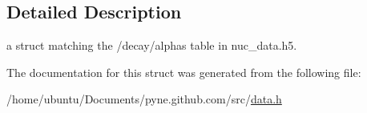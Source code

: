 \subsection{Detailed Description}
a struct matching the \textquotesingle{}/decay/alphas\textquotesingle{} table in nuc\+\_\+data.\+h5. 

The documentation for this struct was generated from the following file\+:\begin{DoxyCompactItemize}
\item 
/home/ubuntu/\+Documents/pyne.\+github.\+com/src/\hyperlink{data_8h}{data.\+h}\end{DoxyCompactItemize}
